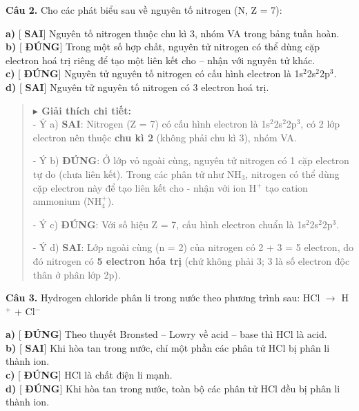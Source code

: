 \documentclass[11pt,a4paper]{article}
\begin{document}
\textbf{Câu 2.} Cho các phát biểu sau về nguyên tố nitrogen (N, Z = 7):

\textbf{a)} [\textbf{\color{mySub} SAI}] Nguyên tố nitrogen thuộc chu kì 3, nhóm VA trong bảng tuần hoàn.\\
\textbf{b)} [\textbf{\color{red} ĐÚNG}] Trong một số hợp chất, nguyên tử nitrogen có thể dùng cặp electron hoá trị riêng để tạo một liên kết cho – nhận với nguyên tử khác.\\
\textbf{c)} [\textbf{\color{red} ĐÚNG}] Nguyên tử nguyên tố nitrogen có cấu hình electron là 1s$^{2}$2s$^{2}$2p$^{3}$.\\
\textbf{d)} [\textbf{\color{mySub} SAI}] Nguyên tử nguyên tố nitrogen có 3 electron hoá trị.\\

\begin{quote}\small
{\color{myBlue}\textbf{$\blacktriangleright$ Giải thích chi tiết:}}\\
- Ý a) \textbf{SAI}: Nitrogen (Z = 7) có cấu hình electron là 1s$^{2}$2s$^{2}$2p$^{3}$, có 2 lớp electron nên thuộc \textbf{chu kì 2} (không phải chu kì 3), nhóm VA.

- Ý b) \textbf{ĐÚNG}: Ở lớp vỏ ngoài cùng, nguyên tử nitrogen có 1 cặp electron tự do (chưa liên kết). Trong các phân tử như NH$_{3}$, nitrogen có thể dùng cặp electron này để tạo liên kết cho - nhận với ion H$^{+}$ tạo cation ammonium (NH$_{4}^{+}$).

- Ý c) \textbf{ĐÚNG}: Với số hiệu Z = 7, cấu hình electron chuẩn là 1s$^{2}$2s$^{2}$2p$^{3}$.

- Ý d) \textbf{SAI}: Lớp ngoài cùng (n = 2) của nitrogen có 2 + 3 = 5 electron, do đó nitrogen có \textbf{5 electron hóa trị} (chứ không phải 3; 3 là số electron độc thân ở phân lớp 2p).
\end{quote}
\vspace{2pt}

\textbf{Câu 3.} Hydrogen chloride phân li trong nước theo phương trình sau: HCl $\longrightarrow$ H$^{+}$ + Cl$^{-}$

\textbf{a)} [\textbf{\color{red} ĐÚNG}] Theo thuyết Bronsted – Lowry về acid – base thì HCl là acid.\\
\textbf{b)} [\textbf{\color{mySub} SAI}] Khi hòa tan trong nước, chỉ một phần các phân tử HCl bị phân li thành ion.\\
\textbf{c)} [\textbf{\color{red} ĐÚNG}] HCl là chất điện li mạnh.\\
\textbf{d)} [\textbf{\color{red} ĐÚNG}] Khi hòa tan trong nước, toàn bộ các phân tử HCl đều bị phân li thành ion.\\
\end{document}
